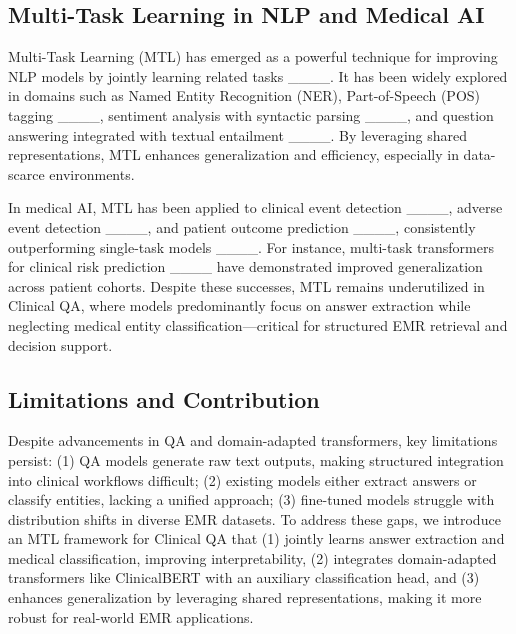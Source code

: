 \subsection{Multi-Task Learning in NLP and Medical AI}
Multi-Task Learning (MTL) has emerged as a powerful technique for improving NLP models by jointly learning related tasks ____. It has been widely explored in domains such as Named Entity Recognition (NER), Part-of-Speech (POS) tagging ____, sentiment analysis with syntactic parsing ____, and question answering integrated with textual entailment ____. By leveraging shared representations, MTL enhances generalization and efficiency, especially in data-scarce environments.

In medical AI, MTL has been applied to clinical event detection ____, adverse event detection ____, and patient outcome prediction ____, consistently outperforming single-task models ____. For instance, multi-task transformers for clinical risk prediction ____ have demonstrated improved generalization across patient cohorts. Despite these successes, MTL remains underutilized in Clinical QA, where models predominantly focus on answer extraction while neglecting medical entity classification—critical for structured EMR retrieval and decision support.


\subsection{Limitations and Contribution}
Despite advancements in QA and domain-adapted transformers, key limitations persist: (1) QA models generate raw text outputs, making structured integration into clinical workflows difficult; (2) existing models either extract answers or classify entities, lacking a unified approach; (3) fine-tuned models struggle with distribution shifts in diverse EMR datasets. To address these gaps, we introduce an MTL framework for Clinical QA that (1) jointly learns answer extraction and medical classification, improving interpretability, (2) integrates domain-adapted transformers like ClinicalBERT with an auxiliary classification head, and (3) enhances generalization by leveraging shared representations, making it more robust for real-world EMR applications.


